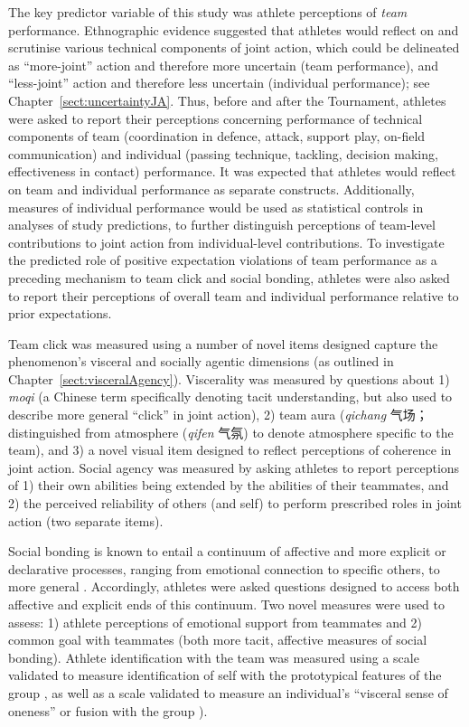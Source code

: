 \begin{CJK}{UTF8}{gbsn}
The key predictor variable of this study was athlete perceptions of \textit{team} performance.  Ethnographic evidence suggested that athletes would reflect on and scrutinise various technical components of joint action, which could be delineated as ``more-joint'' action and therefore more uncertain (team performance), and ``less-joint'' action and therefore less uncertain (individual performance); see Chapter~\ref{sect:uncertaintyJA}.  Thus, before and after the Tournament, athletes were asked to report their perceptions concerning performance of technical components of team (coordination in defence, attack, support play, on-field communication) and individual (passing technique, tackling, decision making, effectiveness in contact) performance.  It was expected that athletes would reflect on team and individual performance as separate constructs.  Additionally, measures of individual performance would be used as statistical controls in analyses of study predictions, to further distinguish perceptions of team-level contributions to joint action from individual-level contributions. To investigate the predicted role of positive expectation violations of team performance as a preceding mechanism to team click and social bonding, athletes were also asked to report their perceptions of overall team and individual performance relative to prior expectations.

Team click was measured using a number of novel items designed capture the phenomenon's visceral and socially agentic dimensions (as outlined in Chapter~\ref{sect:visceralAgency}).  Viscerality was measured by questions about 1) \textit{moqi} (a Chinese term specifically denoting tacit understanding, but also used to describe more general ``click'' in joint action), 2) team aura (\textit{qichang} 气场；distinguished from atmosphere (\textit{qifen} 气氛) to denote atmosphere specific to the team), and 3) a novel visual item designed to reflect perceptions of coherence in joint action.  Social agency was measured by asking athletes to report perceptions of 1) their own abilities being extended by the abilities of their teammates, and 2) the perceived reliability of others (and self) to perform prescribed roles in joint action (two separate items).

Social bonding is known to entail a continuum of affective and more explicit or declarative processes, ranging from emotional connection to specific others, to more general  \citep{Dunbar2010,Whitehouse2014}.  Accordingly, athletes were asked questions designed to  access both affective and explicit ends of this continuum.  Two novel measures were used to assess: 1) athlete perceptions of emotional support from teammates and 2) common goal with teammates (both more tacit, affective measures of social bonding).  Athlete identification with the team was measured using a scale validated to measure identification of self with the prototypical features of the group \citep[Group Identification, see][]{Turner1987}, as well as a scale validated to measure an individual's ``visceral sense of oneness'' or fusion with the group \citep[Identity Fusion; see][]{Swann2009}).


\end{CJK}
